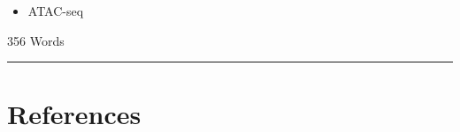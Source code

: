 \documentclass[
  12pt,
]{article}
\providecommand{\tightlist}{%
  \setlength{\itemsep}{0pt}\setlength{\parskip}{0pt}}
\begin{document}
\begin{itemize}
\tightlist
\item
  ATAC-seq
\end{itemize}

\begin{flushright}
356 Words
\end{flushright}

\begin{center}\rule{0.5\linewidth}{0.5pt}\end{center}

\hypertarget{references}{%
\section*{References}\label{references}}
\end{document}
